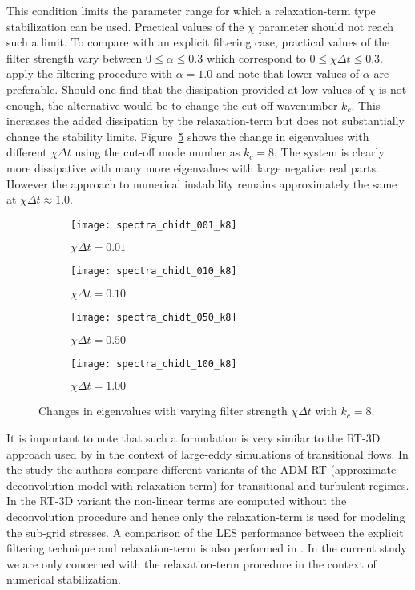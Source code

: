This condition limits the parameter range for which a relaxation-term type stabilization can be used. Practical values of the $\chi$ parameter should not reach such a limit. To compare with an explicit filtering case, practical values of the filter strength vary between $0\le\alpha\le0.3$ which correspond to $0\le\chi\Delta t\le0.3$. \cite{fischer01} apply the filtering procedure with $\alpha=1.0$ and note that lower values of $\alpha$ are preferable. Should one find that the dissipation provided at low values of $\chi$ is not enough, the alternative would be to change the cut-off wavenumber $k_{c}$. This increases the added dissipation by the relaxation-term but does not substantially change the stability limits. Figure~\ref{fig:rt_stability_k8} shows the change in eigenvalues with different $\chi\Delta t$ using the cut-off mode number as $k_{c}=8$. The system is clearly more dissipative with many more eigenvalues with large negative real parts. However the approach to numerical instability remains approximately the same at $\chi\Delta t\approx 1.0$.
\begin{figure}[h]
	\centering
	\begin{subfigure}[b]{0.45\textwidth}
		\centering
		\caption{$\chi\Delta t=0.01$}		
		\texttt{[image: spectra\_chidt\_001\_k8]}
		\label{fig:spectra_chidt001_k8}
	\end{subfigure}
	\begin{subfigure}[b]{0.45\textwidth}
		\centering
		\caption{$\chi\Delta t=0.10$}		
		\texttt{[image: spectra\_chidt\_010\_k8]}
		\label{fig:spectra_chidt01_k8}
	\end{subfigure}
	\begin{subfigure}[b]{0.45\textwidth}
		\centering
		\caption{$\chi\Delta t=0.50$}		
		\texttt{[image: spectra\_chidt\_050\_k8]}
		\label{fig:spectra_chidt050_k8}
	\end{subfigure}
	\begin{subfigure}[b]{0.45\textwidth}
		\centering
		\caption{$\chi\Delta t=1.00$}		
		\texttt{[image: spectra\_chidt\_100\_k8]}
		\label{fig:spectra_chidt100_k8}
	\end{subfigure}	
	\caption{Changes in eigenvalues with varying filter strength $\chi\Delta t$ with $k_{c}=8$.}
	\label{fig:rt_stability_k8}
\end{figure}

It is important to note that such a formulation is very similar to the RT-3D approach used by \cite{schlatter04} in the context of large-eddy simulations of transitional flows. In the study the authors compare different variants of the ADM-RT (approximate deconvolution model with relaxation term) for transitional and turbulent regimes. In the RT-3D variant the non-linear terms are computed without the deconvolution procedure and hence only the relaxation-term is used for modeling the sub-grid stresses. A comparison of the LES performance between the explicit filtering technique and relaxation-term is also performed in \cite{schlatter06b}. In the current study we are only concerned with the relaxation-term procedure in the context of numerical stabilization.

